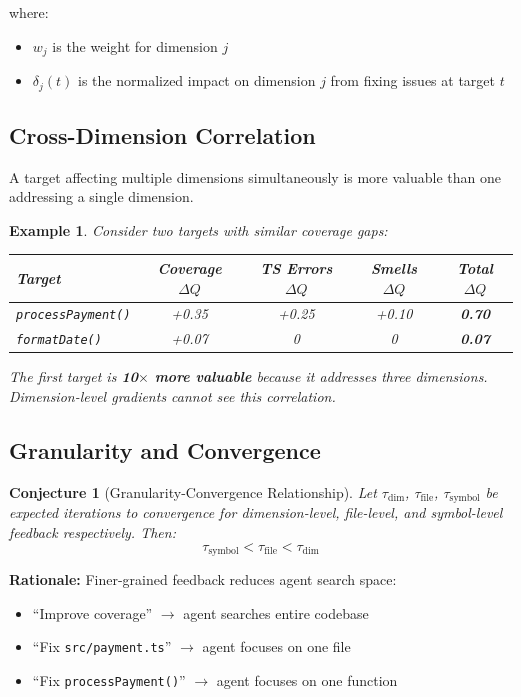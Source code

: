 \documentclass[11pt,a4paper]{article}
\newtheorem{conjecture}[theorem]{Conjecture}
\newtheorem{example}[theorem]{Example}
\begin{document}
where:
\begin{itemize}
  \item $w_j$ is the weight for dimension $j$
  \item $\delta_j(t)$ is the normalized impact on dimension $j$ from fixing issues at target $t$
\end{itemize}

\subsection{Cross-Dimension Correlation}

A target affecting multiple dimensions simultaneously is more valuable than one addressing a single dimension.

\begin{example}
Consider two targets with similar coverage gaps:
\begin{center}
\begin{tabular}{lcccc}
\toprule
\textbf{Target} & \textbf{Coverage $\Delta Q$} & \textbf{TS Errors $\Delta Q$} & \textbf{Smells $\Delta Q$} & \textbf{Total $\Delta Q$} \\
\midrule
\texttt{processPayment()} & +0.35 & +0.25 & +0.10 & \textbf{0.70} \\
\texttt{formatDate()} & +0.07 & 0 & 0 & \textbf{0.07} \\
\bottomrule
\end{tabular}
\end{center}

The first target is \textbf{10$\times$ more valuable} because it addresses three dimensions. Dimension-level gradients cannot see this correlation.
\end{example}

\subsection{Granularity and Convergence}

\begin{conjecture}[Granularity-Convergence Relationship]
\label{conj:granularity}
Let $\tau_{\text{dim}}$, $\tau_{\text{file}}$, $\tau_{\text{symbol}}$ be expected iterations to convergence for dimension-level, file-level, and symbol-level feedback respectively. Then:
\[
\tau_{\text{symbol}} < \tau_{\text{file}} < \tau_{\text{dim}}
\]
\end{conjecture}

\textbf{Rationale:} Finer-grained feedback reduces agent search space:
\begin{itemize}
  \item ``Improve coverage'' $\to$ agent searches entire codebase
  \item ``Fix \texttt{src/payment.ts}'' $\to$ agent focuses on one file
  \item ``Fix \texttt{processPayment()}'' $\to$ agent focuses on one function
\end{itemize}
\end{document}

